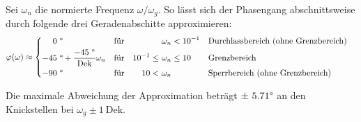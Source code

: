 \begin{frame}
{    %
    Sei $\omega_n$ die normierte Frequenz $\omega/\omega_g$. So lässt sich der Phasengang abschnittsweise durch folgende drei Geradenabschitte approximieren:
    \begin{equation}
        \varphi(\omega) \approx
            \begin{cases}%
                \begin{aligned}%
                    0\ &\degree
                        &&\text{für}&                    &\omega_n < 10^{-1}     &&\text{Durchlassbereich (ohne Grenzbereich)}\\
                    -45\ &\degree + \frac{-45\ \degree}{\mathrm{Dek}}\omega_n
                        &&\text{für}&    10^{-1} \leq\   &\omega_n \leq 10       &&\text{Grenzbereich}\\
                    -90\ &\degree
                        &&\text{für}&    10 <\           &\omega_n               &&\text{Sperrbereich (ohne Grenzbereich)}
                \end{aligned}
            \end{cases}
    \end{equation}

    Die maximale Abweichung der Approximation beträgt  $\pm\ 5.71\degree$ an den Knickstellen bei $\omega_g\pm 1\ \mathrm{Dek}$.

}
\end{frame}
